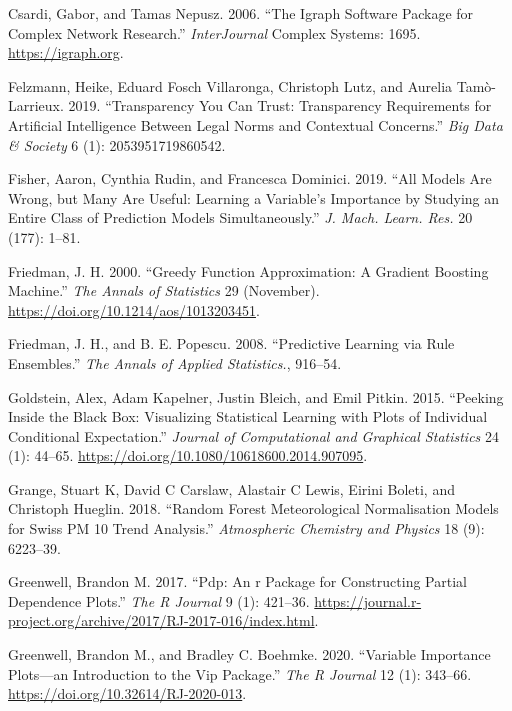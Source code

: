 \begin{CSLReferences}{1}{0}
\leavevmode{}%
Csardi, Gabor, and Tamas Nepusz. 2006. {``The Igraph Software Package for Complex Network Research.''} \emph{InterJournal} Complex Systems: 1695. \url{https://igraph.org}.

\leavevmode{}%
Felzmann, Heike, Eduard Fosch Villaronga, Christoph Lutz, and Aurelia Tamò-Larrieux. 2019. {``Transparency You Can Trust: Transparency Requirements for Artificial Intelligence Between Legal Norms and Contextual Concerns.''} \emph{Big Data \& Society} 6 (1): 2053951719860542.

\leavevmode{}%
Fisher, Aaron, Cynthia Rudin, and Francesca Dominici. 2019. {``All Models Are Wrong, but Many Are Useful: Learning a Variable's Importance by Studying an Entire Class of Prediction Models Simultaneously.''} \emph{J. Mach. Learn. Res.} 20 (177): 1--81.

\leavevmode{}%
Friedman, J. H. 2000. {``Greedy Function Approximation: A Gradient Boosting Machine.''} \emph{The Annals of Statistics} 29 (November). \url{https://doi.org/10.1214/aos/1013203451}.

\leavevmode{}%
Friedman, J. H., and B. E. Popescu. 2008. {``Predictive Learning via Rule Ensembles.''} \emph{The Annals of Applied Statistics.}, 916--54.

\leavevmode{}%
Goldstein, Alex, Adam Kapelner, Justin Bleich, and Emil Pitkin. 2015. {``Peeking Inside the Black Box: Visualizing Statistical Learning with Plots of Individual Conditional Expectation.''} \emph{Journal of Computational and Graphical Statistics} 24 (1): 44--65. \url{https://doi.org/10.1080/10618600.2014.907095}.

\leavevmode{}%
Grange, Stuart K, David C Carslaw, Alastair C Lewis, Eirini Boleti, and Christoph Hueglin. 2018. {``Random Forest Meteorological Normalisation Models for Swiss PM 10 Trend Analysis.''} \emph{Atmospheric Chemistry and Physics} 18 (9): 6223--39.

\leavevmode{}%
Greenwell, Brandon M. 2017. {``Pdp: An r Package for Constructing Partial Dependence Plots.''} \emph{The R Journal} 9 (1): 421--36. \url{https://journal.r-project.org/archive/2017/RJ-2017-016/index.html}.

\leavevmode{}%
Greenwell, Brandon M., and Bradley C. Boehmke. 2020. {``Variable Importance Plots---an Introduction to the Vip Package.''} \emph{The R Journal} 12 (1): 343--66. \url{https://doi.org/10.32614/RJ-2020-013}.


\end{CSLReferences}
